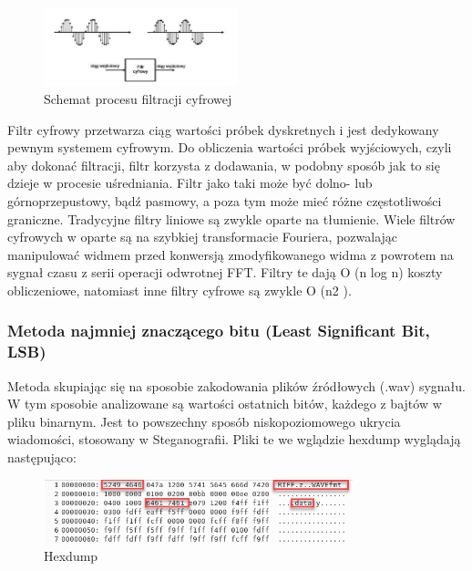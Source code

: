 \documentclass[a4paper,titleauthor]{mwart}
\begin{document}
\begin{figure}[ht]
	\centering
	\includegraphics[width=0.5\textwidth]{filter}
	\caption{Schemat procesu filtracji cyfrowej}
\end{figure}

Filtr cyfrowy przetwarza ciąg wartości próbek dyskretnych i jest dedykowany pewnym systemem cyfrowym. Do obliczenia wartości próbek wyjściowych, czyli aby dokonać filtracji, filtr korzysta z dodawania, w podobny sposób jak to się dzieje w procesie uśredniania. 
\newline\newline
Filtr jako taki może być dolno- lub górnoprzepustowy, bądź pasmowy, a poza tym może mieć różne częstotliwości graniczne.
\newline\newline
Tradycyjne filtry liniowe są zwykle oparte na tłumienie.
Wiele filtrów cyfrowych w oparte są na szybkiej transformacie Fouriera, pozwalając manipulować widmem przed konwersją zmodyfikowanego widma z powrotem na sygnał czasu z serii operacji odwrotnej FFT. Filtry te dają O (n log n) koszty obliczeniowe, natomiast inne filtry cyfrowe są zwykle O (n2 ).\newline\newline

\subsubsection{Metoda najmniej znaczącego bitu (Least Significant Bit, LSB)}

Metoda skupiając się na sposobie zakodowania plików źródłowych (.wav) sygnału. W tym sposobie analizowane są wartości ostatnich bitów, każdego z bajtów w pliku binarnym. Jest to powszechny sposób niskopoziomowego ukrycia wiadomości, stosowany w Steganografii.
\newline \newline
Pliki te we wglądzie hexdump wyglądają następująco:

\begin{figure}[ht]
	\centering
	\includegraphics[width=0.8\textwidth]{hexdump.PNG}
	\caption{Hexdump}
\end{figure}
\end{document}
